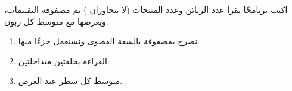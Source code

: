 \begin{statement}
اكتب برنامجًا يقرأ عدد الزبائن  وعدد المنتجات  (لا يتجاوزان ) ثم مصفوفة التقييمات، ويعرضها مع متوسط كل زبون.
\end{statement}
\begin{stepsbox}\begin{enumerate}
\item نصرح بمصفوفة بالسعة القصوى  ونستعمل جزءًا منها.
\item القراءة بحلقتين متداخلتين.
\item متوسط كل سطر عند العرض.
\end{enumerate}\end{stepsbox}
